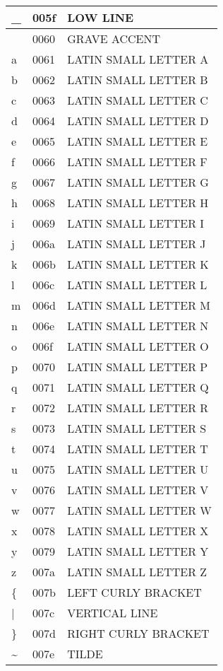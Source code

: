 \documentclass[12pt,letterpaper,openany]{book}
\begin{document}
\begin{center}
\begin{supertabular}{|m{0.25in}|m{0.5in}|m{4in}|}
			\_ & 005f & LOW LINE\\\hline
			\textasciigrave & 0060 & GRAVE ACCENT\\\hline
			a & 0061 & LATIN SMALL LETTER A\\\hline
			b & 0062 & LATIN SMALL LETTER B\\\hline
			c & 0063 & LATIN SMALL LETTER C\\\hline
			d & 0064 & LATIN SMALL LETTER D\\\hline
			e & 0065 & LATIN SMALL LETTER E\\\hline
			f & 0066 & LATIN SMALL LETTER F\\\hline
			g & 0067 & LATIN SMALL LETTER G\\\hline
			h & 0068 & LATIN SMALL LETTER H\\\hline
			i & 0069 & LATIN SMALL LETTER I\\\hline
			j & 006a & LATIN SMALL LETTER J\\\hline
			k & 006b & LATIN SMALL LETTER K\\\hline
			l & 006c & LATIN SMALL LETTER L\\\hline
			m & 006d & LATIN SMALL LETTER M\\\hline
			n & 006e & LATIN SMALL LETTER N\\\hline
			o & 006f & LATIN SMALL LETTER O\\\hline
			p & 0070 & LATIN SMALL LETTER P\\\hline
			q & 0071 & LATIN SMALL LETTER Q\\\hline
			r & 0072 & LATIN SMALL LETTER R\\\hline
			s & 0073 & LATIN SMALL LETTER S\\\hline
			t & 0074 & LATIN SMALL LETTER T\\\hline
			u & 0075 & LATIN SMALL LETTER U\\\hline
			v & 0076 & LATIN SMALL LETTER V\\\hline
			w & 0077 & LATIN SMALL LETTER W\\\hline
			x & 0078 & LATIN SMALL LETTER X\\\hline
			y & 0079 & LATIN SMALL LETTER Y\\\hline
			z & 007a & LATIN SMALL LETTER Z\\\hline
			\{ & 007b & LEFT CURLY BRACKET\\\hline
			| & 007c & VERTICAL LINE\\\hline
			\} & 007d & RIGHT CURLY BRACKET\\\hline
			\textasciitilde & 007e & TILDE\\\hline

\end{supertabular}
\end{center}
\end{document}

